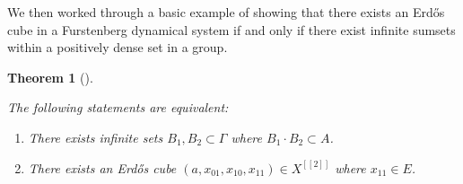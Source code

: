 \documentclass[
  british,
]{article}
\providecommand{\tightlist}{%
  \setlength{\itemsep}{0pt}\setlength{\parskip}{0pt}}
\theoremstyle{plain}
\newtheorem{theorem}{Theorem}[section]
\theoremstyle{definition}
\theoremstyle{remark}
\newcommand{\Group}{{\Gamma}}
\newcommand{\ShiftSpace}{{X}}
\begin{document}
We then worked through a basic example of showing that there exists an
Erdős cube in a Furstenberg dynamical system if and only if there exist
infinite sumsets within a positively dense set in a group.

\begin{theorem}[]\protect\hypertarget{thm-BCExample}{}\label{thm-BCExample}

The following statements are equivalent:

\begin{enumerate}
\def\labelenumi{\arabic{enumi}.}
\tightlist
\item
  There exists infinite sets \(B_1,B_2\subset\Group\) where
  \(B_1\cdot B_2\subset A\).
\item
  There exists an Erdős cube
  \((a,x_{01},x_{10},x_{11})\in\ShiftSpace^{[[2]]}\) where
  \(x_{11}\in E\).
\end{enumerate}

\end{theorem}
\end{document}
